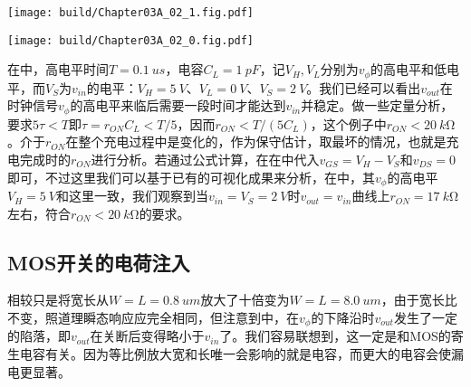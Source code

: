 \begin{Figure}[MOS开关充电时的时域仿真]
    \begin{FigureSub}[$W=L=\SI{0.8}{um}$;MOS开关充电WL0.8]
        \texttt{[image: build/Chapter03A\_02\_1.fig.pdf]}
    \end{FigureSub}
    \begin{FigureSub}[$W=L=\SI{8.0}{um}$;MOS开关充电WL8.0]
        \texttt{[image: build/Chapter03A\_02\_0.fig.pdf]}
    \end{FigureSub}
\end{Figure}
在中，高电平时间$T=\SI{0.1}{us}$，电容$C_L=\SI{1}{pF}$，记$V_H,V_L$分别为$v_{\phi}$的高电平和低电平，而$V_S$为$v_{in}$的电平：$V_H=\SI{5}{V}$、$V_L=\SI{0}{V}$、$V_S=\SI{2}{V}$。我们已经可以看出$v_{out}$在时钟信号$v_{\phi}$的高电平来临后需要一段时间才能达到$v_{in}$并稳定。做一些定量分析，要求$5\tau<T$即$\tau=r_{ON}C_L<T/5$，因而$r_{ON}<T/(5C_L)$，这个例子中$r_{ON}<\SI{20}{k\ohm}$。介于$r_{ON}$在整个充电过程中是变化的，作为保守估计，取最坏的情况，也就是充电完成时的$r_{ON}$进行分析。若通过公式计算，在在中代入$v_{GS}=V_{H}-V_S$和$v_{DS}=0$即可，不过这里我们可以基于已有的可视化成果来分析，在中，其$v_{\phi}$的高电平$V_H=\SI{5}{V}$和这里一致，我们观察到当$v_{in}=V_S=\SI{2}{V}$时$v_{out}=v_{in}$曲线上$r_{ON}=\SI{17}{k\ohm}$左右，符合$r_{ON}<\SI{20}{k\ohm}$的要求。

\subsection{MOS开关的电荷注入}
相较只是将宽长从$W=L=\SI{0.8}{um}$放大了十倍变为$W=L=\SI{8.0}{um}$，由于宽长比不变，照道理瞬态响应应完全相同，但注意到中，在$v_{\phi}$的下降沿时$v_{out}$发生了一定的陷落，即$v_{out}$在关断后变得略小于$v_{in}$了。我们容易联想到，这一定是和MOS的寄生电容有关。因为等比例放大宽和长唯一会影响的就是电容，而更大的电容会使漏电更显著。

